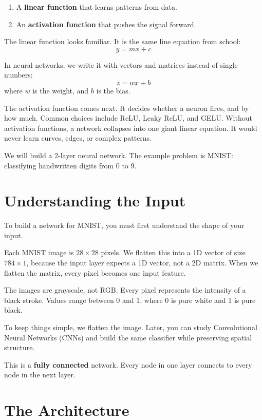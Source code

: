 \documentclass[11pt]{article}
\begin{document}
\begin{enumerate}[noitemsep]
    \item A \textbf{linear function} that learns patterns from data.
    \item An \textbf{activation function} that pushes the signal forward.
\end{enumerate}

The linear function looks familiar. It is the same line equation from school:
\[
y = mx + c
\]

In neural networks, we write it with vectors and matrices instead of single numbers:
\[
z = wx + b
\]
where $w$ is the weight, and $b$ is the bias.

The activation function comes next. It decides whether a neuron fires, and by how much. Common choices include ReLU, Leaky ReLU, and GELU. Without activation functions, a network collapses into one giant linear equation. It would never learn curves, edges, or complex patterns.

We will build a 2-layer neural network. The example problem is MNIST: classifying handwritten digits from 0 to 9.

\section*{Understanding the Input}

To build a network for MNIST, you must first understand the shape of your input.

Each MNIST image is $28 \times 28$ pixels. We flatten this into a 1D vector of size $784 \times 1$, because the input layer expects a 1D vector, not a 2D matrix. When we flatten the matrix, every pixel becomes one input feature.

The images are grayscale, not RGB. Every pixel represents the intensity of a black stroke. Values range between 0 and 1, where 0 is pure white and 1 is pure black.

To keep things simple, we flatten the image. Later, you can study Convolutional Neural Networks (CNNs) and build the same classifier while preserving spatial structure.

This is a \textbf{fully connected} network. Every node in one layer connects to every node in the next layer.

\section*{The Architecture}
\end{document}
